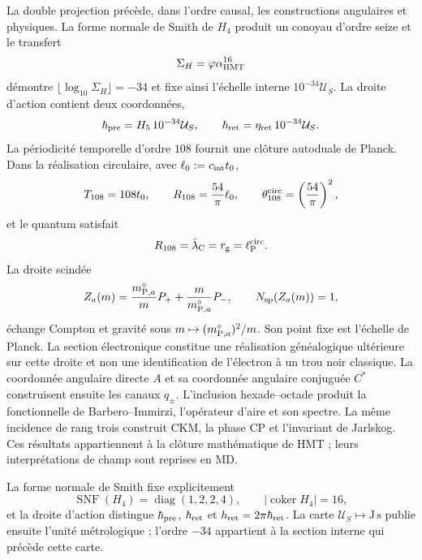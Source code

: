 La double projection précède, dans l'ordre causal, les constructions
angulaires et physiques. La forme normale de Smith de \(H_4\) produit un conoyau
d'ordre seize et le transfert
\[
 \Sigma_H=\varphi\alpha_{\rm HMT}^{16}
\]
démontre
\(\lfloor\log_{10}\Sigma_H\rfloor=-34\) et fixe ainsi l'échelle interne
\(10^{-34}\mathcal U_S\). La droite d'action contient deux
coordonnées,
\[
 \hbar_{\rm pre}=H_5\,10^{-34}\mathcal U_S,\qquad
 \hbar_{\rm ret}=\eta_{\rm ret}\,10^{-34}\mathcal U_S.
\]
La périodicité temporelle d'ordre \(108\) fournit une clôture autoduale
de Planck. Dans la réalisation circulaire, avec
\(\ell_0:=c_{\rm int}t_0\),
\[
 T_{108}=108t_0,
 \qquad
 R_{108}=\frac{54}{\pi}\ell_0,
 \qquad
 \theta_{108}^{\rm circ}=\left(\frac{54}{\pi}\right)^2,
\]
et le quantum satisfait
\[
 R_{108}=\bar\lambda_{\rm C}=r_{\rm g}=\ell_{\rm P}^{\rm circ}.
\]
La droite scindée
\[
 Z_a(m)=\frac{m_{{\rm P},a}^{\circ}}mP_+
       +\frac m{m_{{\rm P},a}^{\circ}}P_-,
 \qquad N_{\rm sp}(Z_a(m))=1,
\]
échange Compton et gravité sous
\(m\mapsto(m_{{\rm P},a}^{\circ})^2/m\). Son point fixe est l'échelle de
Planck. La section électronique constitue une réalisation généalogique
ultérieure sur cette droite et non une identification de l'électron à un trou
noir classique.
La coordonnée angulaire directe \(A\) et sa coordonnée angulaire conjuguée
\(C^*\) construisent ensuite les canaux
\(q_\pm\). L'inclusion hexade--octade produit la fonctionnelle de
Barbero--Immirzi, l'opérateur d'aire et son spectre. La même incidence de
rang trois construit CKM, la phase CP et l'invariant de Jarlskog. Ces
résultats appartiennent à la clôture mathématique de HMT ; leurs interprétations de
champ sont reprises en MD.

La forme normale de Smith fixe explicitement
\[
 \operatorname{SNF}(H_4)=\operatorname{diag}(1,2,2,4),
 \qquad |\operatorname{coker}H_4|=16,
\]
et la droite d'action distingue
\(\hbar_{\rm pre}\), \(\hbar_{\rm ret}\) et
\(h_{\rm ret}=2\pi\hbar_{\rm ret}\). La carte
\(\mathcal U_S\mapsto\mathrm{J\,s}\) publie ensuite l'unité
métrologique ; l'ordre \(-34\) appartient à la section interne qui précède
cette carte.


